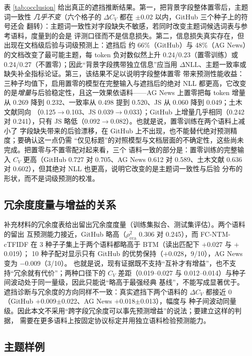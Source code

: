 \documentclass[11pt]{ctexart}
\newcommand{\fcntm}{FC-NTM}
\begin{document}
表 \ref{tab:occlusion} 给出真正的遮挡推断结果。第一，把背景字段整体置零后，主题词一致性
\emph{几乎不变}（六个格子的 $\Delta C_V$ 都在 $\pm$0.02 以内，GitHub 三个种子上的符号还会
翻转）：主题词一致性对字段缺失不敏感，若同时改变主题词候选词表与参考语料，度量到的会是
评测口径而不是信息损失。第二，信息损失真实存在，但出现在文档级后验与词级预测上：遮挡后
约 66\%（GitHub）与 48\%（AG News）的文档改变了最可能主题，每 token 负对数似然上升
0.24/0.23（置零训练）或 0.24/0.27（不置零）；因此“背景字段携带独立信息”应当用
$\Delta\mathrm{NLL}$、主题一致率或缺失补全指标论证。第三，该结果不足以说明字段整体置零
带来预测性能收益：三种子均值下，启用置零的模型在完整输入与遮挡后的绝对 NLL 都更高，它改变
的是\emph{增量}与后验稳定性，且这一效果依语料——AG News 上置零把每 token 增量从 0.269
降到 0.232、一致率从 0.498 提到 0.520、JS 从 0.060 降到 0.049；土木文献同向
（0.125$\rightarrow$0.103、JS 0.039$\rightarrow$0.033）；GitHub 上增量几乎相同（0.242 对
0.241），只有 JS 略低（0.092$\rightarrow$0.082）。也就是说，置零训练在两个语料上减小了
字段缺失带来的后验漂移，在 GitHub 上不出现，也不能替代绝对预测精度；要确认这一点仍需
“仅见标题”的对照模型与文档层面的不确定性，这些尚未完成。把置零与不置零配对起来看，三个
语料一致的部分是：置零训练的完整输入 $C_V$ 更高（GitHub 0.727 对 0.705、AG News 0.612 对
0.589、土木文献 0.636 对 0.602），但其绝对 NLL 也更高，说明它改变的是主题词一致性与后验
分布的形状，而不是词级预测的校准。

\subsection{冗余度度量与增益的关系}



补充材料的冗余度表给出留出冗余度度量（训练集拟合、测试集评估）。两个语料的留出
互预测能力接近，GitHub 略高（$\rho^2_{\mathrm{cca}}$ 0.306 对 0.245），而
\fcntm{}-cTFIDF 在 3 种子子集上于两个语料都略高于 BTM（读出匹配下 $+$0.027 与 $+$0.019）；
10 种子配对显示只有 GitHub 的优势保持（$+$0.028，9/10），AG News 变为 $-$0.009（3/10）。
也就是说，现有证据既不支持“互补才有增益”，也不支持“冗余就有代价”；两种口径下的 $C_V$
差距（0.019--0.027 与 0.012--0.014）与种子间波动处于同一量级，因此只能说“略高于最强经典
基线”，不能写成显著优于。遮挡诊断与冗余度的方向同样不一致：真实遮挡下两个语料的
$\Delta C_V$ 都接近 0（GitHub $+$0.009$\pm$0.022、AG News $+$0.018$\pm$0.013），幅度与
种子间波动同量级。因此本文不采用“跨字段冗余度可以事先预测增益”的说法；要建立这样的判据，
需要在更多语料上按固定协议标定并用独立语料检验预测能力。


\subsection{主题样例}
\end{document}
